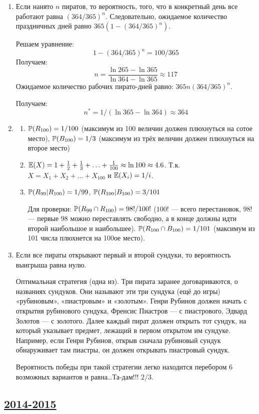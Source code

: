 \begin{enumerate}
\item Если нанято $n$ пиратов, то вероятность, того, что в конкретный день все
работают равна $(364/365)^n$. Следовательно, ожидаемое количество праздничных дней
равно $365(1-(364/365)^n)$.

Решаем уравнение:
\[
1-(364/365)^n=100/365
\]
Получаем:
\[
n=\frac{\ln 265- \ln 365}{ \ln 364 - \ln 365}\approx 117
\]
Ожидаемое количество рабочих пирато-дней равно: $365n(364/365)^n$.

Получаем:
\[
n^*=1/(\ln 365 - \ln 364)\approx 364
\]

\item
\begin{enumerate}
\item $\P(R_{100})=1/100$ (максимум из 100 величин должен плюхнуться на сотое место),
$\P(B_{100})=1/3$ (максимум из трёх величин должен плюхнуться на второе место)
\item $\E(X)=1+\frac{1}{2} + \frac{1}{3}+\ldots + \frac{1}{100}\approx \ln 100 \approx 4.6$.
Т.к. $X=X_1+X_2+\ldots + X_{100}$ и $\E(X_i)=1/i$.
\item $\P(R_{99} | R_{100})=1/99$, $\P(R_{100}|B_{100})=3/101$

Для проверки: $\P(R_{99} \cap R_{100})=98!/100!$ ($100!$ — всего перестановок,
$98!$ — первые 98 можно переставлять свободно, а в конце должны идти второй
наибольшое и наибольшее). $\P(R_{100} \cap B_{100})=1/101$ (максимум из 101 числа
плюхнется на 100ое место).
\end{enumerate}

\item Если все пираты открывают первый и второй сундуки, то вероятность выигрыша
равна нулю.

Оптимальная стратегия (одна из). Три пирата заранее договариваются, о названиях сундуков.
Они называют эти три сундука (ещё до игры)  «рубиновым», «пиастровым» и «золотым».
Генри Рубинов должен начать с открытия рубинового сундука, Френсис Пиастров —
с пиастрового, Эдвард Золотов — с золотого. Далее каждый пират должен открыть тот
сундук, на который указывает предмет, лежащий в первом открытом им сундуке. Например,
если Генри Рубинов, открыв сначала рубиновый сундук обнаруживает там пиастры, он должен
открывать пиастровый сундук.

Вероятность победы при такой стратегии легко находится перебором 6 возможных вариантов
и равна\ldots Та-дам!!! $2/3$.
\end{enumerate}


\subsection[2014-2015]{\hyperref[sec:kr_01_ip_2014_2015]{2014-2015}}
\label{sec:sol_kr_01_ip_2014_2015}


